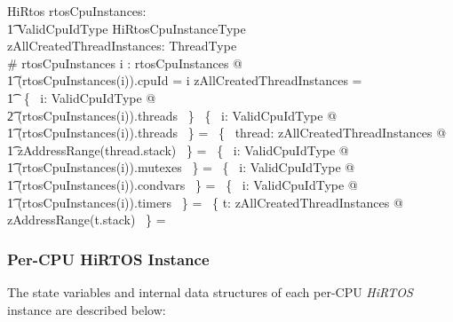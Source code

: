 \documentclass[11pt,letterpaper,twoside,openany]{book}
\begin{document}
\begin{schema}{HiRtos}
    rtosCpuInstances: \\
    \t1 ValidCpuIdType \inj HiRtosCpuInstanceType \\
    zAllCreatedThreadInstances: \finset ThreadType \\
\where
    \# rtosCpuInstances 
\also
    \forall i : \dom rtosCpuInstances @ \\
\t1   (rtosCpuInstances(i)).cpuId = i
\also
    zAllCreatedThreadInstances = \\
\t1    \bigcup~\{~ i: ValidCpuIdType @ \\
\t2    \ran (rtosCpuInstances(i)).threads ~\}
\also
    \bigcap~\{~ i: ValidCpuIdType @ \\
\t1    \ran (rtosCpuInstances(i)).threads ~\} = \emptyset
\also
    \bigcap~\{~ thread: zAllCreatedThreadInstances @ \\
\t1    zAddressRange(thread.stack) ~\} = \emptyset
\also
    \bigcap~\{~ i: ValidCpuIdType @ \\
\t1    \ran (rtosCpuInstances(i)).mutexes ~\} = \emptyset
\also
    \bigcap~\{~ i: ValidCpuIdType @ \\
\t1    \ran (rtosCpuInstances(i)).condvars ~\} = \emptyset
\also
    \bigcap~\{~ i: ValidCpuIdType @ \\
\t1    \ran (rtosCpuInstances(i)).timers ~\} = \emptyset
\also
    \bigcap~\{ t: zAllCreatedThreadInstances @ zAddressRange(t.stack) ~\} = \emptyset
\end{schema}

\subsubsection{Per-CPU HiRTOS Instance}

The state variables and internal data structures of each per-CPU \emph{HiRTOS} instance
are described below:
\end{document}
